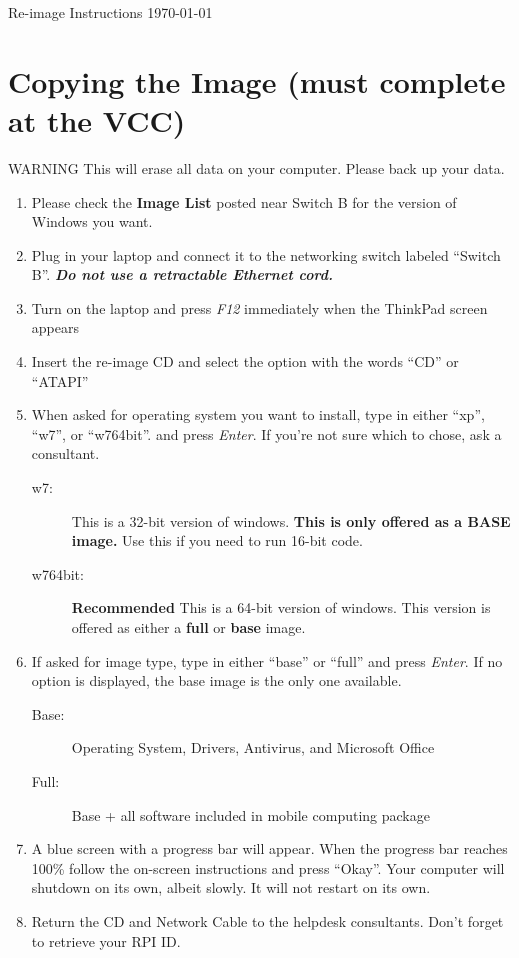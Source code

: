 \documentclass[10pt]{article}
\begin{document}
\begin{flushright}
Re-image Instructions \today
\end{flushright}
\section{Copying the Image (must complete at the VCC)}
{\sc WARNING This will erase all data on your computer. Please back up your data.}
\begin{enumerate}
\item Please check the {\bf Image List} posted near Switch B for the version of Windows you want.
\item Plug in your laptop and connect it to the networking switch labeled ``Switch B''. \emph{\bf Do not use a retractable Ethernet cord.}
\item Turn on the laptop and press \emph{F12} immediately when the ThinkPad screen appears
\item Insert the re-image CD and select the option with the words ``CD'' or ``ATAPI''
\item When asked for operating system you want to install, type in either ``xp'', ``w7'', or ``w764bit''. and press \emph{Enter}. If you're not sure which to chose, ask a consultant.
\begin{description}
\item[w7:] This is a 32-bit version of windows. {\bf This is only offered as a BASE image.} Use this if you need to run 16-bit code.
\item[w764bit:] {\bf Recommended} This is a 64-bit version of windows. This version is offered as either a {\bf full} or {\bf base} image.
\end{description}
\item If asked for image type, type in either ``base'' or ``full'' and press \emph{Enter}. If no option is displayed, the base image is the only one available.
\begin{description}
\item[Base:] Operating System, Drivers, Antivirus, and Microsoft Office
\item[Full:] Base + all software included in mobile computing package
\end{description}
\item A blue screen with a progress bar will appear. When the progress bar reaches 100\% follow the on-screen instructions and press ``Okay''. Your computer will shutdown on its own, albeit slowly. It will not restart on its own.
\item Return the CD and Network Cable to the helpdesk consultants. Don't forget to retrieve your RPI ID.

\end{enumerate}
\end{document}
